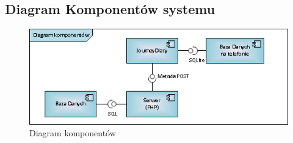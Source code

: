 \documentclass[11pt,a4paper]{article}
\begin{document}
\subsection {Diagram Komponentów systemu}
\begin{figure}[ht]
    \includegraphics[scale=0.6]{component.png}
    \caption{Diagram komponentów}
 \end{figure}
\end{document}
